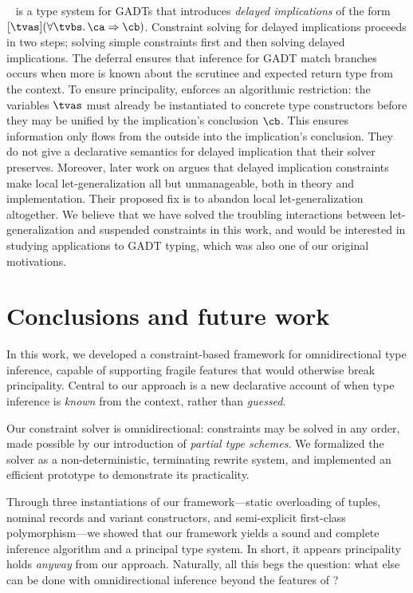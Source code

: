 \documentclass[acmsmall,screen,nonacm,review]{acmart}
\begin{document}
\OutsideIn~\citep*{conf/icfp/SchrijversJSV09} is a type system for GADTs that
introduces \emph{delayed implications} of the form $\where{\tvs}(\all \tvbs \ca
\Rightarrow \cb)$. Constraint solving for delayed implications proceeds in two
steps; solving simple constraints first and then solving delayed implications.
The deferral ensures that inference for GADT match branches occurs when more is
known about the scrutinee and expected return type from the context.
%
To ensure principality, \OutsideIn enforces an algorithmic
restriction: the variables $\tvs$ must already be instantiated to
concrete type constructors before they may be unified by the
implication's conclusion $\cb$. This ensures information only flows
from the outside into the implication's conclusion. They do not give
a declarative semantics for delayed implication that their solver
preserves. Moreover, later work on \OutsideIn argues
\citep*{Vytiniotis-Peyton-Jones-Schrijvers-Sulzmann/outsidein@jfp2011}
that delayed implication constraints make local let-generalization all
but unmanageable, both in theory and implementation. Their proposed fix
is to abandon local let-generalization altogether. We believe that we
have solved the troubling interactions between let-generalization and
suspended constraints in this work, and would be interested in
studying applications to GADT typing, which was also one of our
original motivations.

\section{Conclusions and future work}
\label{sec:discussion}
\label{sec:future-work}

In this work, we developed a constraint-based framework for omnidirectional
type inference, capable of supporting fragile features that would otherwise
break principality.
%
Central to our approach is a new declarative account of when type inference is
\emph{known} from the context, rather than \emph{guessed}.

Our constraint solver is omnidirectional: constraints may be solved in any
order, made possible by our introduction of \emph{partial type schemes}.
We formalized the solver as a non-deterministic, terminating rewrite system,
and implemented an efficient prototype to demonstrate its practicality.

Through three instantiations of our framework---static overloading of
tuples, nominal records and variant constructors, and semi-explicit
first-class polymorphism---we showed that our framework yields a sound and
complete inference algorithm and a principal type system. In short, it
appears principality holds \emph{anyway} from our approach.
%
Naturally, all this begs the question: what else can be done with
omnidirectional inference beyond the features of \OML?
\end{document}
